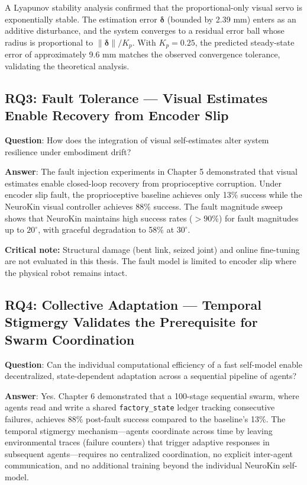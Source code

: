 \documentclass[12pt,a4paper,oneside]{report}
\begin{document}
A Lyapunov stability analysis confirmed that the proportional-only visual servo is exponentially stable. The estimation error $\boldsymbol{\delta}$ (bounded by 2.39 mm) enters as an additive disturbance, and the system converges to a residual error ball whose radius is proportional to $\|\boldsymbol{\delta}\|/K_p$. With $K_p = 0.25$, the predicted steady-state error of approximately 9.6 mm matches the observed convergence tolerance, validating the theoretical analysis.

\subsection{RQ3: Fault Tolerance --- Visual Estimates Enable Recovery from Encoder Slip}

\textbf{Question}: How does the integration of visual self-estimates alter system resilience under embodiment drift?

\textbf{Answer}: The fault injection experiments in Chapter 5 demonstrated that visual estimates enable closed-loop recovery from proprioceptive corruption. Under encoder slip fault, the proprioceptive baseline achieves only 13\% success while the NeuroKin visual controller achieves 88\% success. The fault magnitude sweep shows that NeuroKin maintains high success rates ($>90\%$) for fault magnitudes up to $20^\circ$, with graceful degradation to 58\% at $30^\circ$.

\textbf{Critical note:} Structural damage (bent link, seized joint) and online fine-tuning are not evaluated in this thesis. The fault model is limited to encoder slip where the physical robot remains intact.

\subsection{RQ4: Collective Adaptation --- Temporal Stigmergy Validates the Prerequisite for Swarm Coordination}

\textbf{Question}: Can the individual computational efficiency of a fast self-model enable decentralized, state-dependent adaptation across a sequential pipeline of agents?

\textbf{Answer}: Yes. Chapter 6 demonstrated that a 100-stage sequential swarm, where agents read and write a shared \texttt{factory\_state} ledger tracking consecutive failures, achieves 88\% post-fault success compared to the baseline's 13\%. The temporal stigmergy mechanism---agents coordinate across time by leaving environmental traces (failure counters) that trigger adaptive responses in subsequent agents---requires no centralized coordination, no explicit inter-agent communication, and no additional training beyond the individual NeuroKin self-model.
\end{document}
